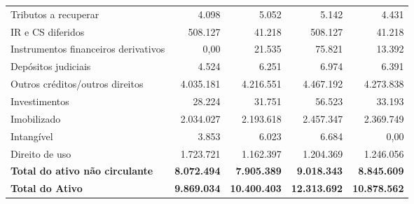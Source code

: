 \documentclass[1pt,a4paper]{article}
\begin{document}
\begin{longtable}{p{6cm}r r r r }
			Tributos a recuperar & 4.098 & 5.052 & 5.142 & 4.431 \\
			IR e CS diferidos & 508.127 & 41.218 & 508.127 & 41.218 \\
			Instrumentos financeiros derivativos & 0,00 & 21.535 & 75.821 & 13.392 \\
			Depósitos judiciais & 4.524 & 6.251 & 6.974 & 6.391 \\
			Outros créditos/outros direitos & 4.035.181 & 4.216.551 & 4.467.192 & 4.273.838 \\
			Investimentos & 28.224 & 31.751 & 56.523 & 33.193 \\
			Imobilizado & 2.034.027 & 2.193.618 & 2.457.347 & 2.369.749 \\
			Intangível & 3.853 & 6.023 & 6.684 & 0,00 \\
			Direito de uso & 1.723.721 & 1.162.397 & 1.204.369 & 1.246.056 \\
			\rowcolor{darkgray}\textbf{Total do ativo não circulante} & \textbf{8.072.494} & \textbf{7.905.389} & \textbf{9.018.343} & \textbf{8.845.609} \\
			\midrule
			\rowcolor{darkgray}\textbf{Total do Ativo} & \textbf{9.869.034 } & \textbf{10.400.403} & \textbf{12.313.692} & \textbf{10.878.562} \\
			\bottomrule
		\end{longtable}
		
		
		
\end{document}
